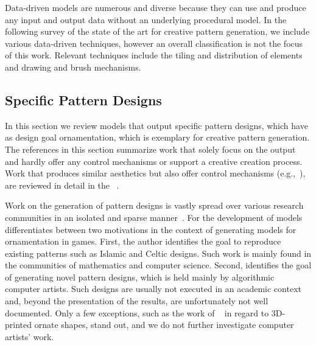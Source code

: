 Data-driven models are numerous and diverse because they can use and produce any input and output data without an underlying procedural model. In the following survey of the state of the art for creative pattern generation, we include various data-driven techniques, however an overall classification is not the focus of this work. Relevant techniques include the tiling and distribution of elements and drawing and brush mechanisms.



\subsection{Specific Pattern Designs}
\label{subsec:specific_pattern_designs}

In this section we review models that output specific pattern designs, which have as design goal ornamentation, which is exemplary for creative pattern generation. The references in this section summarize work that solely focus on the output and hardly offer any control mechanisms or support a creative creation process. Work that produces similar aesthetics but also offer control mechanisms (e.g.,~\cite{wong_1998_cgf,yu_2012_ans,zehnder_2016_dso}), are reviewed in detail in the ~.


Work on the generation of pattern designs is vastly spread over various research communities in an isolated and sparse manner~\cite{whitehead_2010_tpd}. For the development of models \citeauthor*{whitehead_2010_tpd}~\cite{whitehead_2010_tpd} differentiates between two motivations in the context of generating models for ornamentation in games. First, the author identifies the goal to reproduce existing patterns such as Islamic and Celtic designs. Such work is mainly found in the communities of mathematics and computer science. Second, \citeauthor*{whitehead_2010_tpd} identifies the goal of generating novel pattern designs, which is held mainly by algorithmic computer artists. Such designs are usually not executed in an academic context and, beyond the presentation of the results, are unfortunately not well documented. Only a few exceptions, such as the work of \citeauthor*{takayama_2016_med}~\cite{takayama_2016_med} in regard to 3D-printed ornate shapes, stand out, and we do not further investigate computer artists' work.

